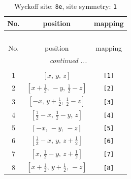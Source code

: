 \documentclass[fleqn,8pt]{jsarticle}
\begin{document}
\renewcommand{\arraystretch}{1.2}
\begin{longtable}{ccc}
\caption{Wyckoff site: {\tt 8e}, site symmetry: {\tt 1}}
 \\
 \hline \hline
No. & position & mapping \\ \hline \endfirsthead

\multicolumn{2}{l}{\tablename\ \thetable{}} \\
 \hline \hline
No. & position & mapping \\ \hline \endhead

 \hline \hline
\multicolumn{2}{r}{\footnotesize\it continued ...} \\ \endfoot

 \hline \hline
\multicolumn{2}{r}{} \\ \endlastfoot

1 & $\left[ x,\, y,\, z \right]$ & {\tt [1]} \\ \hline
2 & $\left[ x + \frac{1}{2},\, - y,\, \frac{1}{2} - z \right]$ & {\tt [2]} \\ \hline
3 & $\left[ - x,\, y + \frac{1}{2},\, \frac{1}{2} - z \right]$ & {\tt [3]} \\ \hline
4 & $\left[ \frac{1}{2} - x,\, \frac{1}{2} - y,\, z \right]$ & {\tt [4]} \\ \hline
5 & $\left[ - x,\, - y,\, - z \right]$ & {\tt [5]} \\ \hline
6 & $\left[ \frac{1}{2} - x,\, y,\, z + \frac{1}{2} \right]$ & {\tt [6]} \\ \hline
7 & $\left[ x,\, \frac{1}{2} - y,\, z + \frac{1}{2} \right]$ & {\tt [7]} \\ \hline
8 & $\left[ x + \frac{1}{2},\, y + \frac{1}{2},\, - z \right]$ & {\tt [8]} \\
\end{longtable}
\end{document}
